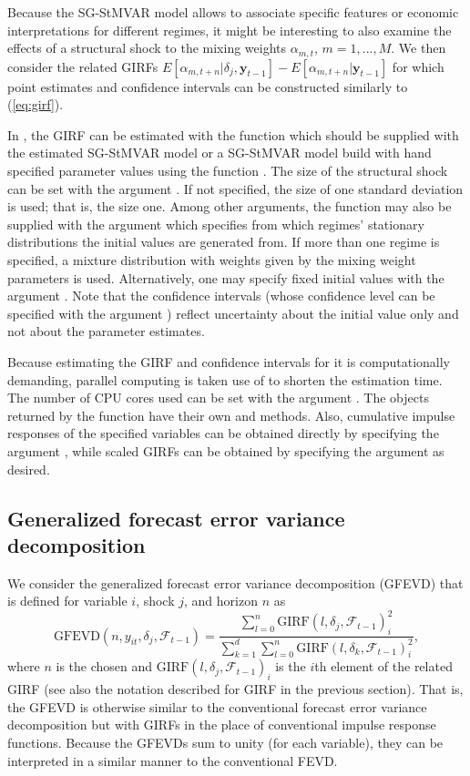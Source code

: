 \documentclass[nojss]{jss} %
\begin{document}
Because the SG-StMVAR model allows to associate specific features or economic interpretations for different regimes, it might be interesting to also examine the effects of a structural shock to the mixing weights $\alpha_{m,t}$, $m=1,...,M$. We then consider the related GIRFs $E[\alpha_{m,t+n}|\delta_j,\boldsymbol{y}_{t-1}] - E[\alpha_{m,t+n}|\boldsymbol{y}_{t-1}]$ for which point estimates and confidence intervals can be constructed similarly to (\ref{eq:girf}).

In , the GIRF can be estimated with the function  which should be supplied with the estimated SG-StMVAR model or a SG-StMVAR model build with hand specified parameter values using the function . The size of the structural shock can be set with the argument . If not specified, the size of one standard deviation is used; that is, the size one. Among other arguments, the function may also be supplied with the argument  which specifies from which regimes' stationary distributions the initial values are generated from. If more than one regime is specified, a mixture distribution with weights given by the mixing weight parameters is used. Alternatively, one may specify fixed initial values with the argument . Note that the confidence intervals (whose confidence level can be specified with the argument ) reflect uncertainty about the initial value only and not about the parameter estimates.

Because estimating the GIRF and confidence intervals for it is computationally demanding, parallel computing is taken use of to shorten the estimation time. The number of CPU cores used can be set with the argument . The objects returned by the  function have their own  and  methods. Also, cumulative impulse responses of the specified variables can be obtained directly by specifying the argument , while scaled GIRFs can be obtained by specifying the argument  as desired.

\subsection{Generalized forecast error variance decomposition}
We consider the generalized forecast error variance decomposition (GFEVD) \cite{Lanne+Nyberg:2016}  that is defined for variable $i$, shock $j$, and horizon $n$ as
\begin{equation}
\text{GFEVD}(n,y_{it}, \delta_j,\mathcal{F}_{t-1}) = \frac{\sum_{l=0}^n\text{GIRF}(l,\delta_j,\mathcal{F}_{t-1})_i^2}{\sum_{k=1}^d\sum_{l=0}^n\text{GIRF}(l,\delta_k,\mathcal{F}_{t-1})_i^2},
\end{equation}
where $n$ is the chosen and $\text{GIRF}(l,\delta_j,\mathcal{F}_{t-1})_i$ is the $i$th element of the related GIRF (see also the notation described for GIRF in the previous section). That is, the GFEVD is otherwise similar to the conventional forecast error variance decomposition but with GIRFs in the place of conventional impulse response functions. Because the GFEVDs sum to unity (for each variable), they can be interpreted in a similar manner to the conventional FEVD.
\end{document}
